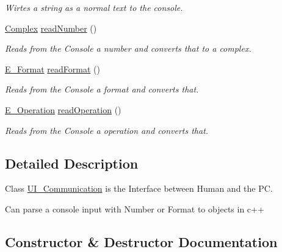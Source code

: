 \begin{DoxyCompactItemize}
\begin{DoxyCompactList}\small\item\em Wirtes a string as a normal text to the console. \end{DoxyCompactList}\item 
\mbox{\hyperlink{class_complex}{Complex}} \mbox{\hyperlink{class_u_i___communication_ab148ad16ca061fc9235f5950ec0aff85}{read\+Number}} ()
\begin{DoxyCompactList}\small\item\em Reads from the Console a number and converts that to a complex. \end{DoxyCompactList}\item 
\mbox{\hyperlink{_complex_8h_adaa0992033b28ba1421a05c029ffa82e}{E\+\_\+\+Format}} \mbox{\hyperlink{class_u_i___communication_a05dcd3ca7e560c0e09b1174ca7e8d727}{read\+Format}} ()
\begin{DoxyCompactList}\small\item\em Reads from the Console a format and converts that. \end{DoxyCompactList}\item 
\mbox{\hyperlink{_calculation_8h_a57e7c508a7a8b39e59743eb5a00b2ef7}{E\+\_\+\+Operation}} \mbox{\hyperlink{class_u_i___communication_a53c5898becc61bc725b6c3a648719b42}{read\+Operation}} ()
\begin{DoxyCompactList}\small\item\em Reads from the Console a operation and converts that. \end{DoxyCompactList}\end{DoxyCompactItemize}


\subsection{Detailed Description}
Class \mbox{\hyperlink{class_u_i___communication}{U\+I\+\_\+\+Communication}} is the Interface between Human and the PC. 

Can parse a console input with Number or Format to objects in c++ 

\subsection{Constructor \& Destructor Documentation}
\mbox{\label{class_u_i___communication_aa7f9e5d5a946a33469e8a76e1fdbdec8}} 
